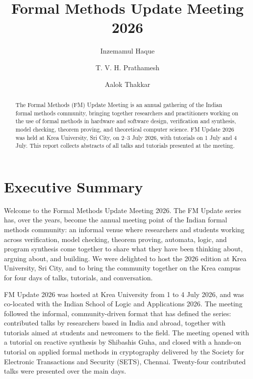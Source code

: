 \documentclass[a4paper,UKenglish]{dagrep-v2021}
\title{Formal Methods Update Meeting 2026}
\author[1]{Inzemamul Haque}
\author[2]{T. V. H. Prathamesh}
\author[3]{Aalok Thakkar}
\affil[1]{Krea University, Sri City, India \texttt{inzemamul.haque@krea.edu.in}}
\affil[2]{Krea University, Sri City, India \texttt{prathamesh.turaga@krea.edu.in}}
\affil[3]{Ashoka University, Sonipat, India \texttt{thakkar@ashoka.edu.in}}
\begin{document}
\maketitle

\begin{abstract}
The Formal Methods (FM) Update Meeting is an annual gathering of the Indian formal methods community, bringing together researchers and practitioners working on the use of formal methods in hardware and software design, verification and synthesis, model checking, theorem proving, and theoretical computer science. FM Update 2026 was held at Krea University, Sri City, on 2--3 July 2026, with tutorials on 1 July and 4 July. This report collects abstracts of all talks and tutorials presented at the meeting.
\end{abstract}

\newpage

\section{Executive Summary}

Welcome to the Formal Methods Update Meeting 2026. The FM Update series has, over the years, become the annual meeting point of the Indian formal methods community: an informal venue where researchers and students working across verification, model checking, theorem proving, automata, logic, and program synthesis come together to share what they have been thinking about, arguing about, and building. We were delighted to host the 2026 edition at Krea University, Sri City, and to bring the community together on the Krea campus for four days of talks, tutorials, and conversation.

FM Update 2026 was hosted at Krea University from 1 to 4 July 2026, and was co-located with the Indian School of Logic and Applications 2026. The meeting followed the informal, community-driven format that has defined the series: contributed talks by researchers based in India and abroad, together with tutorials aimed at students and newcomers to the field. The meeting opened with a tutorial on reactive synthesis by Shibashis Guha, and closed with a hands-on tutorial on applied formal methods in cryptography delivered by the Society for Electronic Transactions and Security (SETS), Chennai. Twenty-four contributed talks were presented over the main days.
\end{document}
